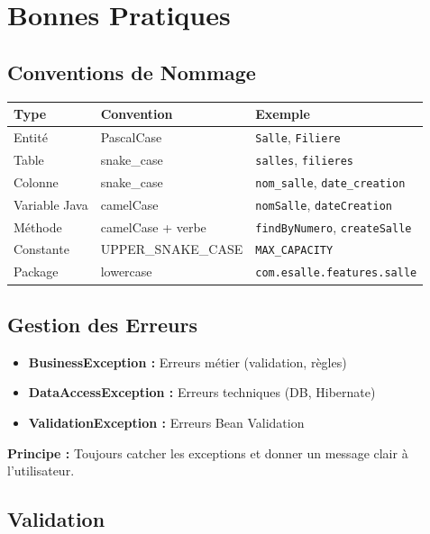 \documentclass[12pt,a4paper]{article}
\begin{document}
\newpage

\section{Bonnes Pratiques}

\subsection{Conventions de Nommage}

\begin{center}
\begin{tabular}{|l|l|l|}
\hline
\textbf{Type} & \textbf{Convention} & \textbf{Exemple} \\
\hline
Entité & PascalCase & \texttt{Salle}, \texttt{Filiere} \\
\hline
Table & snake\_case & \texttt{salles}, \texttt{filieres} \\
\hline
Colonne & snake\_case & \texttt{nom\_salle}, \texttt{date\_creation} \\
\hline
Variable Java & camelCase & \texttt{nomSalle}, \texttt{dateCreation} \\
\hline
Méthode & camelCase + verbe & \texttt{findByNumero}, \texttt{createSalle} \\
\hline
Constante & UPPER\_SNAKE\_CASE & \texttt{MAX\_CAPACITY} \\
\hline
Package & lowercase & \texttt{com.esalle.features.salle} \\
\hline
\end{tabular}
\end{center}

\subsection{Gestion des Erreurs}

\begin{itemize}
    \item \textbf{BusinessException :} Erreurs métier (validation, règles)
    \item \textbf{DataAccessException :} Erreurs techniques (DB, Hibernate)
    \item \textbf{ValidationException :} Erreurs Bean Validation
\end{itemize}

\textbf{Principe :} Toujours catcher les exceptions et donner un message clair à l'utilisateur.

\subsection{Validation}
\end{document}
